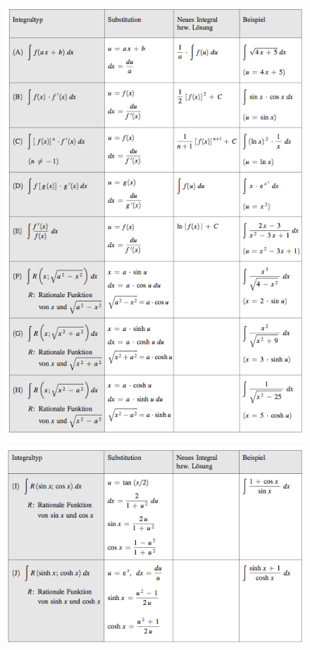 \documentclass[a4paper,landscape,8pt]{extarticle}
\begin{document}
\begin{multicols*}{4}
\begin{figure}[H]
 	\centering
  	\includegraphics[width=1\linewidth]{img/int1.png}
\end{figure}
\begin{figure}[H]
 	\centering
  	\includegraphics[width=1\linewidth]{img/int2.png}
\end{figure}



\end{multicols*}
\end{document}
